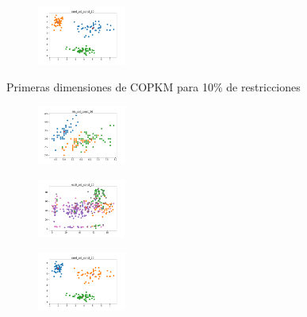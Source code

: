 \begin{figure}[H]
\begin{subfigure}
    \end{subfigure}
    \hfill
    \begin{subfigure}
        \centering
        \includegraphics[width=0.32\textwidth]{img/copkm/rand_set_const_10_3773969821_clust.png}
    \end{subfigure}
    \caption{Primeras dimensiones de COPKM para 10\% de restricciones}
\end{figure}

\newpage

\begin{figure}[H]    
    \centering
    \begin{subfigure}
        \centering
        \includegraphics[width=0.32\textwidth]{img/copkm/iris_set_const_20_949004259_clust.png}
    \end{subfigure}
    \hfill
    \begin{subfigure}
        \centering
        \includegraphics[width=0.32\textwidth]{img/copkm/ecoli_set_const_20_949004259_clust.png}
    \end{subfigure}
    \hfill
    \begin{subfigure}
        \centering
        \includegraphics[width=0.32\textwidth]{img/copkm/rand_set_const_20_949004259_clust.png}
    \end{subfigure}

\end{figure}
